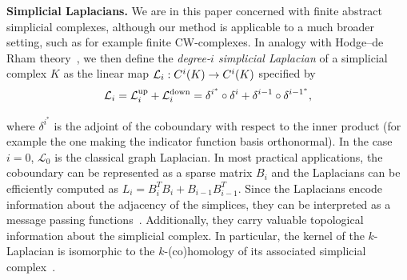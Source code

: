 \textbf{Simplicial Laplacians.} We are in this paper concerned with finite abstract simplicial complexes, although our method is applicable to a much broader setting, such as for example finite CW-complexes. %
In analogy with Hodge--de Rham theory~\cite{madsen1997calculus}, we then define the \emph{degree-$i$ simplicial Laplacian} of a simplicial complex $K$ as the linear map $\mathcal{L}_i:C^i(K)\to C^i(K)$ specified by
\begin{equation*}
  \mathcal{L}_i = \mathcal{L}^{\text{up}}_i + \mathcal{L}^{\text{down}}_i = \delta^{{i}^{\ast}}\circ\delta^{i} + \delta^{i-1}\circ\delta^{{i-1}^{\ast}},
\end{equation*}

where $\delta^{{i}^{\ast}}$ is the adjoint of the coboundary with respect to the inner product (for example the one making the indicator function basis orthonormal). In the case $i=0$, $\mathcal{L}_0$ is the classical graph Laplacian. In most practical applications, the coboundary can be represented as a sparse matrix $B_i$ and the Laplacians can be efficiently computed as $L_i=B_i^T B_{i}+B_{i-1}B_{i-1}^T$.  Since the Laplacians encode information about the adjacency of the simplices, they can be interpreted as a message passing functions~\cite{gilmer2017NeuralMP}. Additionally, they carry valuable topological information about the simplicial complex. In particular, the kernel of the $k$-Laplacian is isomorphic to the $k$-(co)homology of its associated simplicial complex~\cite{eckmann1944,horak2013spectra}.
